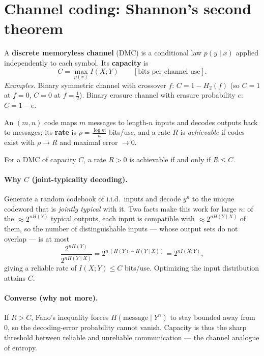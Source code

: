 \documentclass[11pt]{article}
\begin{document}
\section{Channel coding: Shannon's second theorem}
A \textbf{discrete memoryless channel} (DMC) is a conditional law $p(y\mid x)$ applied
independently to each symbol. Its \textbf{capacity} is
\begin{equation}
  C=\max_{p(x)} I(X;Y)\qquad[\text{bits per channel use}].
\end{equation}
\emph{Examples.} Binary symmetric channel with crossover $f$: $C=1-H_2(f)$ (so $C=1$ at $f=0$,
$C=0$ at $f=\tfrac12$). Binary erasure channel with erasure probability $e$: $C=1-e$.

An $(m,n)$ code maps $m$ messages to length-$n$ inputs and decodes outputs back to messages; its
\textbf{rate} is $\rho=\tfrac{\log m}{n}$ bits/use, and a rate $R$ is \emph{achievable} if codes
exist with $\rho\to R$ and maximal error $\to0$.

\begin{theorem}\label{thm:channel}
For a DMC of capacity $C$, a rate $R>0$ is achievable if and only if $R\le C$.
\end{theorem}

\paragraph{Why $C$ (joint-typicality decoding).} Generate a random codebook of i.i.d.\ inputs and
decode $y^n$ to the unique codeword that is \emph{jointly typical} with it. Two facts make this
work for large $n$: of the $\approx 2^{nH(Y)}$ typical outputs, each input is compatible with
$\approx 2^{nH(Y\mid X)}$ of them, so the number of distinguishable inputs --- whose output sets do
not overlap --- is at most
\begin{equation}
  \frac{2^{nH(Y)}}{2^{nH(Y\mid X)}}=2^{n\,(H(Y)-H(Y\mid X))}=2^{nI(X;Y)} ,
\end{equation}
giving a reliable rate of $I(X;Y)\le C$ bits/use. Optimizing the input distribution attains $C$.
\paragraph{Converse (why not more).} If $R>C$, Fano's inequality forces $H(\text{message}\mid Y^n)$
to stay bounded away from $0$, so the decoding-error probability cannot vanish. Capacity is thus the
sharp threshold between reliable and unreliable communication --- the channel analogue of entropy.
\end{document}
